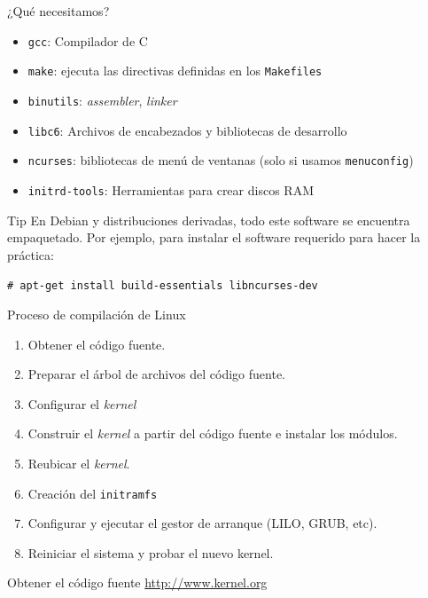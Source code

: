 \begin{frame}{¿Qué necesitamos?}
\begin{itemize}
\item \texttt{gcc}: Compilador de C

\item \texttt{make}: ejecuta las directivas definidas en los
  \texttt{Makefiles}
\item \texttt{binutils}: \textit{assembler}, \textit{linker}
\item \texttt{libc6}: Archivos de encabezados y bibliotecas de desarrollo
\item \texttt{ncurses}: bibliotecas de menú de ventanas (solo si usamos
  \texttt{menuconfig})
\item \texttt{initrd-tools}: Herramientas para crear discos RAM
\end{itemize}
\pause
\begin{block}{Tip}
  En Debian y distribuciones derivadas, todo este software se encuentra
  empaquetado. Por ejemplo, para instalar el software requerido para hacer
  la práctica:

  \texttt{\# apt-get install build-essentials libncurses-dev}
\end{block}
\end{frame}

\begin{frame}{Proceso de compilación de Linux}
\begin{enumerate}
\item Obtener el código fuente.
\item Preparar el árbol de archivos del código fuente.
\item Configurar el \textit{kernel}
\item Construir el \textit{kernel} a partir del código fuente e instalar los
  módulos.
\item Reubicar el \textit{kernel}.
\item Creación del \texttt{initramfs}
\item Configurar y ejecutar el gestor de arranque (LILO, GRUB, etc).
\item Reiniciar el sistema y probar el nuevo kernel.
\end{enumerate}
\end{frame}

\begin{frame}{Obtener el código fuente}
  \large \url{http://www.kernel.org}
  \begin{center}
   \end{center}
\end{frame}

